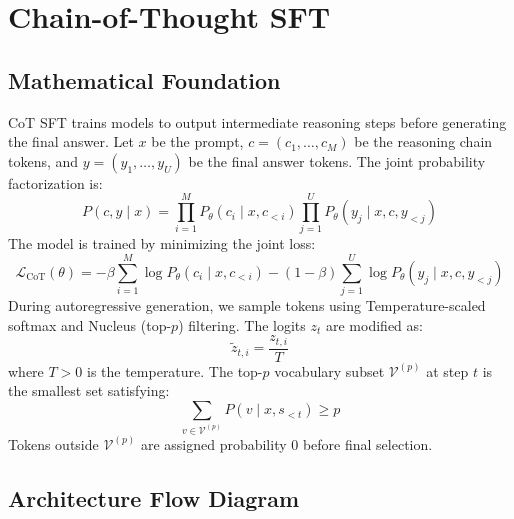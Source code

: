 \newpage
\section{Chain-of-Thought SFT}

\subsection{Mathematical Foundation}
CoT SFT trains models to output intermediate reasoning steps before generating the final answer. Let $x$ be the prompt, $c = (c_1, \dots, c_M)$ be the reasoning chain tokens, and $y = (y_1, \dots, y_U)$ be the final answer tokens. The joint probability factorization is:
\begin{equation}
  P(c, y \mid x) = \prod_{i=1}^M P_\theta(c_i \mid x, c_{<i}) \prod_{j=1}^U P_\theta(y_j \mid x, c, y_{<j})
\end{equation}
The model is trained by minimizing the joint loss:
\begin{equation}
  \mathcal{L}_{\text{CoT}}(\theta) = -\beta \sum_{i=1}^M \log P_\theta(c_i \mid x, c_{<i}) - (1 - \beta) \sum_{j=1}^U \log P_\theta(y_j \mid x, c, y_{<j})
\end{equation}
During autoregressive generation, we sample tokens using Temperature-scaled softmax and Nucleus (top-$p$) filtering. The logits $z_t$ are modified as:
\begin{equation}
  \tilde{z}_{t,i} = \frac{z_{t,i}}{T}
\end{equation}
where $T > 0$ is the temperature. The top-$p$ vocabulary subset $\mathcal{V}^{(p)}$ at step $t$ is the smallest set satisfying:
\begin{equation}
  \sum_{v \in \mathcal{V}^{(p)}} P(v \mid x, s_{<t}) \ge p
\end{equation}
Tokens outside $\mathcal{V}^{(p)}$ are assigned probability 0 before final selection.

\subsection{Architecture Flow Diagram}

